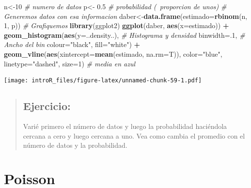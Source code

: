 \documentclass[
]{book}
\newenvironment{Shaded}{\begin{snugshade}}{\end{snugshade}}
\newcommand{\CommentTok}[1]{\textcolor[rgb]{0.56,0.35,0.01}{\textit{#1}}}
\newcommand{\DataTypeTok}[1]{\textcolor[rgb]{0.13,0.29,0.53}{#1}}
\newcommand{\DecValTok}[1]{\textcolor[rgb]{0.00,0.00,0.81}{#1}}
\newcommand{\FloatTok}[1]{\textcolor[rgb]{0.00,0.00,0.81}{#1}}
\newcommand{\KeywordTok}[1]{\textcolor[rgb]{0.13,0.29,0.53}{\textbf{#1}}}
\newcommand{\NormalTok}[1]{#1}
\newcommand{\OperatorTok}[1]{\textcolor[rgb]{0.81,0.36,0.00}{\textbf{#1}}}
\newcommand{\StringTok}[1]{\textcolor[rgb]{0.31,0.60,0.02}{#1}}
\begin{document}
\begin{Shaded}
\begin{Highlighting}[]
\NormalTok{n<-}\DecValTok{10} \CommentTok{# numero de datos}
\NormalTok{p<-}\StringTok{ }\FloatTok{0.5} \CommentTok{# probabilidad (~proporcion de unos)}
\CommentTok{# Generemos datos con esa informacion }
\NormalTok{daber<-}\KeywordTok{data.frame}\NormalTok{(}\DataTypeTok{estimado=}\KeywordTok{rbinom}\NormalTok{(n, }\DecValTok{1}\NormalTok{, p)) }
\CommentTok{# Grafiquemos }
\KeywordTok{library}\NormalTok{(ggplot2)}
\KeywordTok{ggplot}\NormalTok{(daber, }\KeywordTok{aes}\NormalTok{(}\DataTypeTok{x=}\NormalTok{estimado)) }\OperatorTok{+}\StringTok{ }
\StringTok{    }\KeywordTok{geom_histogram}\NormalTok{(}\KeywordTok{aes}\NormalTok{(}\DataTypeTok{y=}\NormalTok{..density..), }\CommentTok{# Histograma y densidad }
                   \DataTypeTok{binwidth=}\NormalTok{.}\DecValTok{1}\NormalTok{, }\CommentTok{# Ancho del bin}
                   \DataTypeTok{colour=}\StringTok{"black"}\NormalTok{, }\DataTypeTok{fill=}\StringTok{"white"}\NormalTok{) }\OperatorTok{+}\StringTok{ }
\StringTok{        }\KeywordTok{geom_vline}\NormalTok{(}\KeywordTok{aes}\NormalTok{(}\DataTypeTok{xintercept=}\KeywordTok{mean}\NormalTok{(estimado, }\DataTypeTok{na.rm=}\NormalTok{T)), }
          \DataTypeTok{color=}\StringTok{"blue"}\NormalTok{, }\DataTypeTok{linetype=}\StringTok{"dashed"}\NormalTok{, }\DataTypeTok{size=}\DecValTok{1}\NormalTok{) }\CommentTok{# media en azul}
\end{Highlighting}
\end{Shaded}

\texttt{[image: introR\_files/figure-latex/unnamed-chunk-59-1.pdf]}

\begin{quote}
\hypertarget{ejercicio-6}{%
\subsection{Ejercicio:}\label{ejercicio-6}}

Varié primero el número de datos y luego la probabilidad haciéndola cercana a cero y luego cercana a uno. Vea como cambia el promedio con el número de datos y la probabilidad.
\end{quote}

\hypertarget{poisson}{%
\section{Poisson}\label{poisson}}
\end{document}
